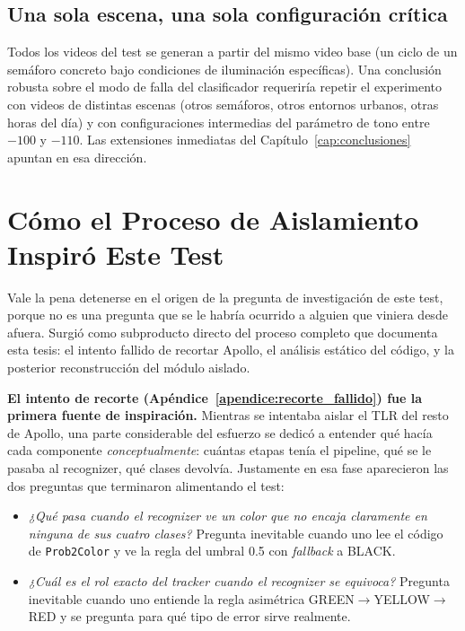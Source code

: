 \subsection{Una sola escena, una sola configuración crítica}

Todos los videos del test se generan a partir del mismo video base (un ciclo de un semáforo concreto bajo condiciones de iluminación específicas). Una conclusión robusta sobre el modo de falla del clasificador requeriría repetir el experimento con videos de distintas escenas (otros semáforos, otros entornos urbanos, otras horas del día) y con configuraciones intermedias del parámetro de tono entre $-100$ y $-110$. Las extensiones inmediatas del Capítulo~\ref{cap:conclusiones} apuntan en esa dirección.

\section{Cómo el Proceso de Aislamiento Inspiró Este Test}

Vale la pena detenerse en el origen de la pregunta de investigación de este test, porque no es una pregunta que se le habría ocurrido a alguien que viniera desde afuera. Surgió como subproducto directo del proceso completo que documenta esta tesis: el intento fallido de recortar Apollo, el análisis estático del código, y la posterior reconstrucción del módulo aislado.

\textbf{El intento de recorte (Apéndice~\ref{apendice:recorte_fallido}) fue la primera fuente de inspiración.} Mientras se intentaba aislar el TLR del resto de Apollo, una parte considerable del esfuerzo se dedicó a entender qué hacía cada componente \textit{conceptualmente}: cuántas etapas tenía el pipeline, qué se le pasaba al recognizer, qué clases devolvía. Justamente en esa fase aparecieron las dos preguntas que terminaron alimentando el test:

\begin{itemize}
    \item \textit{¿Qué pasa cuando el recognizer ve un color que no encaja claramente en ninguna de sus cuatro clases?} Pregunta inevitable cuando uno lee el código de \texttt{Prob2Color} y ve la regla del umbral 0.5 con \textit{fallback} a BLACK.
    \item \textit{¿Cuál es el rol exacto del \textit{tracker} cuando el recognizer se equivoca?} Pregunta inevitable cuando uno entiende la regla asimétrica GREEN$\to$YELLOW$\to$RED y se pregunta para qué tipo de error sirve realmente.
\end{itemize}

